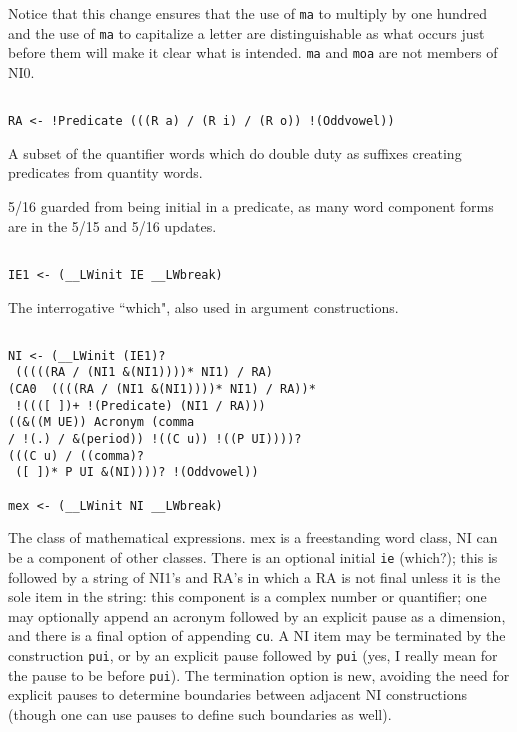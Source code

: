 \documentclass[12pt]{article}
\begin{document}
Notice that this change ensures that the use of {\tt ma} to multiply by one hundred and the use of {\tt ma} to capitalize a letter are distinguishable as what occurs just before them will make it clear what is intended.  {\tt ma} and {\tt moa} are not members of NI0.

\begin{verbatim}

RA <- !Predicate (((R a) / (R i) / (R o)) !(Oddvowel))

\end{verbatim}

A subset of the quantifier words which do double duty as suffixes creating predicates from quantity words.

5/16 guarded from being initial in a predicate, as many word component forms are in the 5/15 and 5/16 updates.

\begin{verbatim}

IE1 <- (__LWinit IE __LWbreak)

\end{verbatim}

The interrogative ``which", also used in argument constructions.

\begin{verbatim}

NI <- (__LWinit (IE1)?
 (((((RA / (NI1 &(NI1))))* NI1) / RA)
(CA0  ((((RA / (NI1 &(NI1))))* NI1) / RA))*
 !((([ ])+ !(Predicate) (NI1 / RA))) 
((&((M UE)) Acronym (comma 
/ !(.) / &(period)) !((C u)) !((P UI))))? 
(((C u) / ((comma)?
 ([ ])* P UI &(NI))))? !(Oddvowel))

mex <- (__LWinit NI __LWbreak)

\end{verbatim}

The class of mathematical expressions.  mex is a freestanding word class, NI can be a component of other classes.  There is an optional initial {\tt ie} (which?); this is followed by a string of NI1's and RA's in which a RA is not final unless it is the sole item in the string:  this component is a complex number or quantifier; one may optionally append an acronym followed by an explicit pause as a dimension, and there is a final option of appending {\tt cu}.  A NI item may be terminated
by the construction {\tt pui}, or by an explicit pause followed by {\tt pui} (yes, I really mean for the pause to be before
{\tt pui}).  The termination option is new, avoiding the need for explicit pauses to determine boundaries between adjacent NI constructions (though one can use pauses to define such boundaries as well).
\end{document}
